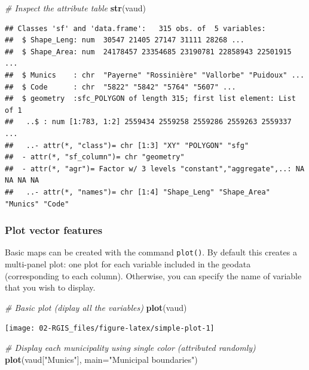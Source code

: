 \documentclass[
]{article}
\newenvironment{Shaded}{\begin{snugshade}}{\end{snugshade}}
\newcommand{\AttributeTok}[1]{\textcolor[rgb]{0.13,0.29,0.53}{#1}}
\newcommand{\CommentTok}[1]{\textcolor[rgb]{0.56,0.35,0.01}{\textit{#1}}}
\newcommand{\FunctionTok}[1]{\textcolor[rgb]{0.13,0.29,0.53}{\textbf{#1}}}
\newcommand{\NormalTok}[1]{#1}
\newcommand{\StringTok}[1]{\textcolor[rgb]{0.31,0.60,0.02}{#1}}
\begin{document}
\begin{Shaded}
\begin{Highlighting}[]
\CommentTok{\# Inspect the attribute table }
\FunctionTok{str}\NormalTok{(vaud)}
\end{Highlighting}
\end{Shaded}

\begin{verbatim}
## Classes 'sf' and 'data.frame':   315 obs. of  5 variables:
##  $ Shape_Leng: num  30547 21405 27147 31111 28268 ...
##  $ Shape_Area: num  24178457 23354685 23190781 22858943 22501915 ...
##  $ Munics    : chr  "Payerne" "Rossinière" "Vallorbe" "Puidoux" ...
##  $ Code      : chr  "5822" "5842" "5764" "5607" ...
##  $ geometry  :sfc_POLYGON of length 315; first list element: List of 1
##   ..$ : num [1:783, 1:2] 2559434 2559258 2559286 2559263 2559337 ...
##   ..- attr(*, "class")= chr [1:3] "XY" "POLYGON" "sfg"
##  - attr(*, "sf_column")= chr "geometry"
##  - attr(*, "agr")= Factor w/ 3 levels "constant","aggregate",..: NA NA NA NA
##   ..- attr(*, "names")= chr [1:4] "Shape_Leng" "Shape_Area" "Munics" "Code"
\end{verbatim}

\subsubsection{Plot vector features}\label{plot-vector-features}

Basic maps can be created with the command \texttt{plot()}. By default this creates a multi-panel plot: one plot for each variable included in the geodata (corresponding to each column). Otherwise, you can specify the name of variable that you wish to display.

\begin{Shaded}
\begin{Highlighting}[]
\CommentTok{\# Basic plot (diplay all the variables)}
\FunctionTok{plot}\NormalTok{(vaud) }
\end{Highlighting}
\end{Shaded}

\begin{center}\texttt{[image: 02-RGIS\_files/figure-latex/simple-plot-1]} \end{center}

\begin{Shaded}
\begin{Highlighting}[]
\CommentTok{\# Display each municipality using single color (attributed randomly)}
\FunctionTok{plot}\NormalTok{(vaud[}\StringTok{"Munics"}\NormalTok{], }\AttributeTok{main=}\StringTok{"Municipal boundaries"}\NormalTok{)}
\end{Highlighting}
\end{Shaded}
\end{document}
